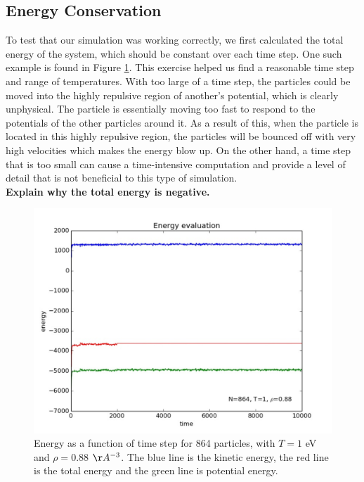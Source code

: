 \documentclass{article}
\begin{document}
\begin{multicols}{2}
\subsection{Energy Conservation}

To test that our simulation was working correctly, we first calculated the total energy of the system, which should be constant over each time step.  One such example is found in Figure \ref{engcons}.  This exercise helped us find a reasonable time step and range of temperatures.  With too large of a time step, the particles could be moved into the highly repulsive region of another's potential, which is clearly unphysical. The particle is essentially moving too fast to respond to the potentials of the other particles around it. As a result of this, when the particle is located in this highly repulsive region, the particles will be bounced off with very high velocities which makes the energy blow up. On the other hand, a time step that is too small can cause a time-intensive computation and provide a level of detail that is not beneficial to this type of simulation.  \\

\textbf{Explain why the total energy is negative.}\\

\begin{figure}[H]
\begin{center}
\includegraphics[width=\linewidth]{plots/energyT1rho088N864lpnum1000.pdf}
\caption{Energy as a function of time step for 864 particles, with $T=1$ eV and $\rho = 0.88$ $\AA ^{-3}$.  The blue line is the kinetic energy, the red line is the total energy and the green line is potential energy.}
\label{engcons}
\end{center}
\end{figure}


\end{multicols}
\end{document}
